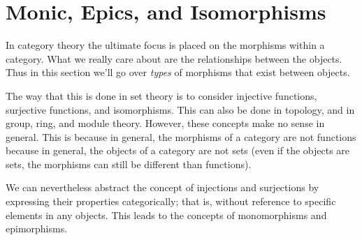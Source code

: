     \newpage
    \section{Monic, Epics, and Isomorphisms}
    In category theory the ultimate focus is placed on the morphisms within a category.
    What we really care about are the relationships between the objects.
    Thus in this section we'll go over \emph{types} of morphisms that exist between objects.

    The way that this is done in set theory is to consider injective functions, surjective 
    functions, and isomorphisms. This can also be done in topology, and in group, ring, and module 
    theory. However, these concepts make no sense in general. This is because
    in general, the morphisms of a category are not functions because in general, 
    the objects of a category are not sets (even if the objects are sets, the morphisms 
    can still be different than functions). 

    We can nevertheless abstract the concept of injections and surjections by 
    expressing their properties categorically; that is, without reference to specific 
    elements in any objects. This leads to the concepts of monomorphisms and epimorphisms.
    \vspace{0.3cm}

